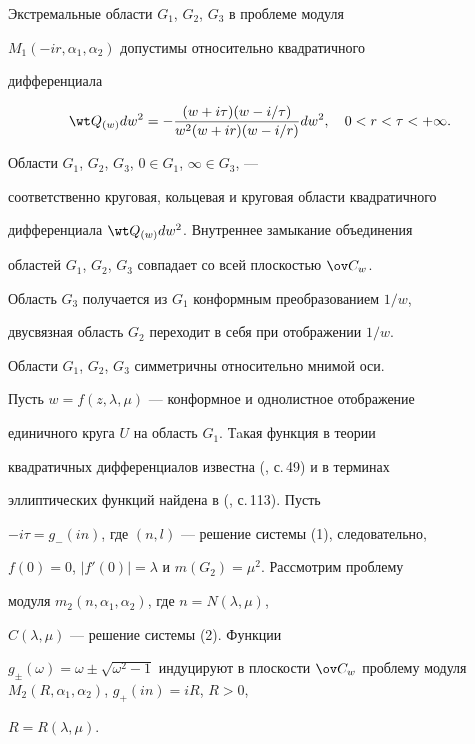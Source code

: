  


Экстремальные области $G_1$, $G_2$, $G_3$ в проблеме модуля 


$M_1(-ir,\alpha_1,\alpha_2)$ допустимы относительно квадратичного 


дифференциала 


$$ 


\wt Q_{(w)}d w^2=- 


\frac{(w+i\tau)(w-i/\tau)}{w^2(w+ir)(w-i/r)}d w^2,\quad 


0<r<\tau<+\infty. 


$$ 


Области $G_1$, $G_2$, $G_3$, $0\in G_1$, $\infty\in G_3$, --- 


соответственно круговая, кольцевая и круговая области квадратичного 


дифференциала $\wt Q_{(w)}d w^2$. Внутреннее замыкание объединения 


областей $G_1$, $G_2$, $G_3$ совпадает со всей плоскостью $\ov C_w$. 


Область $G_3$ получается из $G_1$ конформным преобразованием $1/w$,


двусвязная область $G_2$ переходит в себя при отображении $1/w$. 


Области $G_1$, $G_2$, $G_3$ симметричны относительно мнимой оси. 


 


Пусть $w=f(z,\lambda,\mu)$ --- конформное и однолистное отображение 


единичного круга $U$ на область $G_1$. Тaкая функция в теории 


квадратичных дифференциалов известна (\cite{1}, с.\,49) и в терминах 


эллиптических функций найдена в (\cite{3}, с.\,113). Пусть 


$-i\tau=g_-(in)$, где $(n,l)$ --- решение системы (1), следовательно, 


$f(0)=0$, $|f'(0)|=\lambda$ и $m(G_2)=\mu^2$. Рассмотрим проблему 


модуля $m_2(n,\alpha_1,\alpha_2)$, где $n=N(\lambda,\mu)$, 


$C(\lambda,\mu)$ --- решение системы (2). Функции 


$g_\pm(\omega)=\omega\pm\sqrt{\omega^2-1}$ индуцируют в плоскости $\ov 


C_w$ проблему модуля $M_2(R,\alpha_1,\alpha_2)$, $g_+(in)=iR$, $R>0$, 


$R=R(\lambda,\mu)$. 


